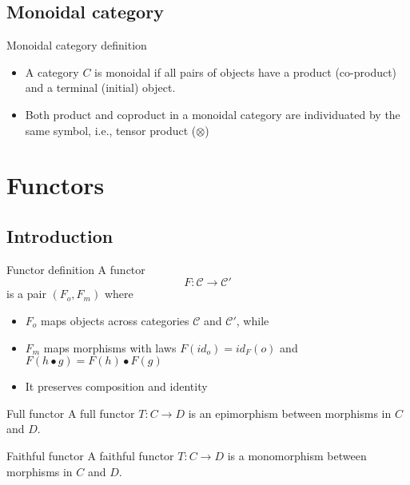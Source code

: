 \documentclass[presentation]{beamer}
\begin{document}
\subsection{Monoidal category}
\label{sec:org6b6bc0b}
\begin{frame}[label={sec:orgaec9b92}]{Monoidal category definition}
\begin{itemize}
\item A category \(C\) is \alert{monoidal} if \alert{all} pairs of objects have a product
(co-product) and a terminal (initial) object.

\item Both product and coproduct in a monoidal category are individuated by the
same symbol, i.e., \alert{tensor product} (\(\otimes\))
\end{itemize}
\end{frame}

\section{Functors}
\label{sec:org7d5e3ac}
\subsection{Introduction}
\label{sec:orgb1792e3}
\begin{frame}[label={sec:orgfd350a7}]{Functor definition}
A functor \[ F : \mathcal{C} \rightarrow \mathcal{C'} \] is a pair \((F_o, F_m)\) where

\begin{itemize}
\item \(F_o\) maps objects across categories \(\mathcal{C}\) and \(\mathcal{C'}\), while

\item \(F_m\) maps morphisms with laws \(F(id_o) = id_F(o)\) and \(F(h \bullet g) = F(h) \bullet F(g)\)

\item It preserves composition and identity
\end{itemize}
\end{frame}

\begin{frame}[label={sec:orgb09facb}]{Full functor}
A \alert{full functor} \(T: C \rightarrow D\) is an \alert{epimorphism} between morphisms in \(C\) and \(D\).
\end{frame}

\begin{frame}[label={sec:org4bbff7d}]{Faithful functor}
A faithful functor \(T: C \rightarrow D\) is a \alert{monomorphism} between morphisms in \(C\) and \(D\).
\end{frame}
\end{document}
